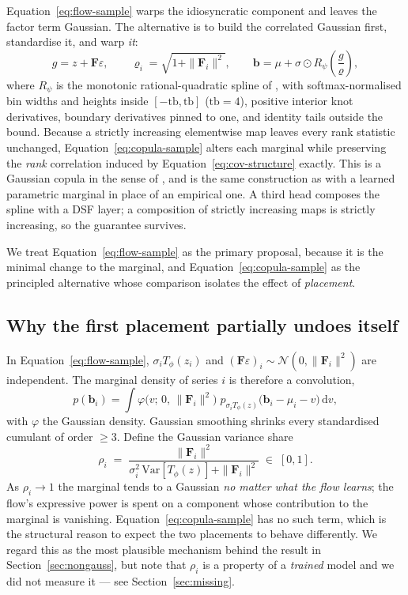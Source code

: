 \documentclass[11pt]{article}
\newcommand{\bvec}{\mathbf{b}}
\newcommand{\Fmat}{\mathbf{F}}
\begin{document}
Equation~\eqref{eq:flow-sample} warps the idiosyncratic component and leaves the
factor term Gaussian. The alternative is to build the correlated Gaussian first,
standardise it, and warp \emph{it}:
\begin{equation}
g = z + \Fmat \varepsilon,
\qquad
\varrho_i = \sqrt{1 + \|\Fmat_i\|^2},
\qquad
\bvec = \mu + \sigma \odot R_\psi\!\left(\frac{g}{\varrho}\right),
\label{eq:copula-sample}
\end{equation}
where $R_\psi$ is the monotonic rational-quadratic spline of \citet{durkan2019nsf},
with softmax-normalised bin widths and heights inside $[-\text{tb}, \text{tb}]$
($\text{tb}=4$), positive interior knot derivatives, boundary derivatives pinned to
one, and identity tails outside the bound. Because a strictly increasing elementwise
map leaves every rank statistic unchanged, Equation~\eqref{eq:copula-sample} alters
each marginal while preserving the \emph{rank} correlation induced by
Equation~\eqref{eq:cov-structure} exactly. This is a Gaussian copula in the sense of
\citet{sklar1959}, and is the same construction as
\citet{salinas2019copula} with a learned parametric marginal in place of an empirical
one. A third head composes the spline with a DSF layer; a composition of strictly
increasing maps is strictly increasing, so the guarantee survives.

We treat Equation~\eqref{eq:flow-sample} as the primary proposal, because it is the
minimal change to the marginal, and Equation~\eqref{eq:copula-sample} as the
principled alternative whose comparison isolates the effect of \emph{placement}.

\subsection{Why the first placement partially undoes itself}
\label{sec:convolution}

In Equation~\eqref{eq:flow-sample}, $\sigma_i T_\phi(z_i)$ and
$(\Fmat\varepsilon)_i \sim \mathcal{N}(0, \|\Fmat_i\|^2)$ are independent. The
marginal density of series $i$ is therefore a convolution,
\begin{equation}
p(\bvec_i) = \int
\varphi\bigl(v;\,0,\,\|\Fmat_i\|^2\bigr)\;
p_{\sigma_i T_\phi(z)}\bigl(\bvec_i - \mu_i - v\bigr)\,\mathrm{d}v ,
\label{eq:convolution}
\end{equation}
with $\varphi$ the Gaussian density. Gaussian smoothing shrinks every standardised
cumulant of order $\ge 3$. Define the Gaussian variance share
\begin{equation}
\rho_i \;=\;
\frac{\|\Fmat_i\|^2}{\sigma_i^2\,\mathrm{Var}[T_\phi(z)] + \|\Fmat_i\|^2}
\;\in\; [0,1] .
\label{eq:rho}
\end{equation}
As $\rho_i \to 1$ the marginal tends to a Gaussian \emph{no matter what the flow
learns}; the flow's expressive power is spent on a component whose contribution to
the marginal is vanishing. Equation~\eqref{eq:copula-sample} has no such term, which
is the structural reason to expect the two placements to behave differently. We
regard this as the most plausible mechanism behind the result in
Section~\ref{sec:nongauss}, but note that $\rho_i$ is a property of a \emph{trained}
model and we did not measure it --- see Section~\ref{sec:missing}.
\end{document}
